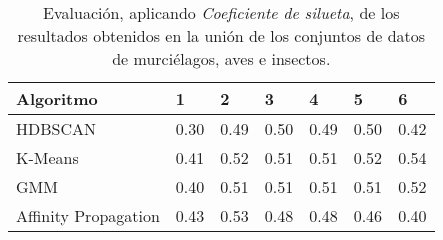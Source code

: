 \begin{table}[H]
    \centering
    \begin{tabular}{lllllll}
        \hline
        Algoritmo & 1 & 2 & 3 & 4 & 5 & 6  \\ \hline
        HDBSCAN & 0.30 & 0.49 & 0.50 & 0.49 & 0.50 & 0.42 \\
        K-Means & 0.41 & 0.52 & 0.51 & 0.51 & 0.52 & \cellcolor[HTML]{FFFC9E}0.54 \\
        GMM & 0.40 & 0.51 & 0.51 & 0.51 & 0.51 & 0.52 \\
        Affinity Propagation & 0.43 & 0.53 & 0.48 & 0.48 & 0.46 & 0.40 \\
    \end{tabular}
    \caption{Evaluación, aplicando \textit{Coeficiente de silueta}, de los resultados obtenidos en la unión de los conjuntos de datos de murciélagos, aves e insectos.}
    \label{table:all-silhouette}
\end{table}